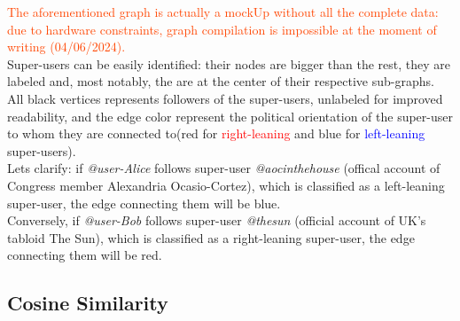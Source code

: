 \textcolor{OrangeRed}{The aforementioned graph is actually a mockUp without all the complete data: due to hardware constraints, graph compilation is impossible at the moment of writing (04/06/2024).}\\
Super-users can be easily identified: their nodes are bigger than the rest, they are labeled and, most notably, the are at the center of their respective sub-graphs. \\
All black vertices represents followers of the super-users, unlabeled for improved readability, and the edge color represent the political orientation of the super-user to whom they are connected to(red for \textcolor{red}{right-leaning} and blue for \textcolor{blue}{left-leaning} super-users). \\
Lets clarify: if \textit{@user-Alice} follows super-user \textit{@aocinthehouse} (offical account of Congress member Alexandria Ocasio-Cortez), which is classified as a left-leaning super-user, the edge connecting them will be blue. \\
Conversely, if \textit{@user-Bob} follows super-user \textit{@thesun} (official account of UK's tabloid The Sun), which is classified as a right-leaning super-user, the edge connecting them will be red.

\subsection{Cosine Similarity}